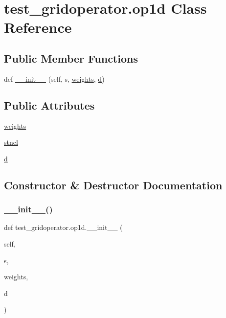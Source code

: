 \hypertarget{classtest__gridoperator_1_1op1d}{}\section{test\+\_\+gridoperator.\+op1d Class Reference}
\label{classtest__gridoperator_1_1op1d}
\subsection*{Public Member Functions}
\begin{DoxyCompactItemize}
\item 
def \hyperlink{classtest__gridoperator_1_1op1d_abed571af32c5a4254f4a5f52532385c1}{\+\_\+\+\_\+init\+\_\+\+\_\+} (self, s, \hyperlink{classtest__gridoperator_1_1op1d_a58838139fd821a835a5beaef4dd6bbac}{weights}, \hyperlink{classtest__gridoperator_1_1op1d_a8f22b6d9225e596f3db185ff9326782b}{d})
\end{DoxyCompactItemize}
\subsection*{Public Attributes}
\begin{DoxyCompactItemize}
\item 
\hyperlink{classtest__gridoperator_1_1op1d_a58838139fd821a835a5beaef4dd6bbac}{weights}
\item 
\hyperlink{classtest__gridoperator_1_1op1d_ac381dbfbf8f31ce990371a5e434a70fc}{stncl}
\item 
\hyperlink{classtest__gridoperator_1_1op1d_a8f22b6d9225e596f3db185ff9326782b}{d}
\end{DoxyCompactItemize}


\subsection{Constructor \& Destructor Documentation}
\mbox{\label{classtest__gridoperator_1_1op1d_abed571af32c5a4254f4a5f52532385c1}} 
\subsubsection{\texorpdfstring{\+\_\+\+\_\+init\+\_\+\+\_\+()}{\_\_init\_\_()}}
{\footnotesize\ttfamily def test\+\_\+gridoperator.\+op1d.\+\_\+\+\_\+init\+\_\+\+\_\+ (\begin{DoxyParamCaption}\item[{}]{self,  }\item[{}]{s,  }\item[{}]{weights,  }\item[{}]{d }\end{DoxyParamCaption})}



